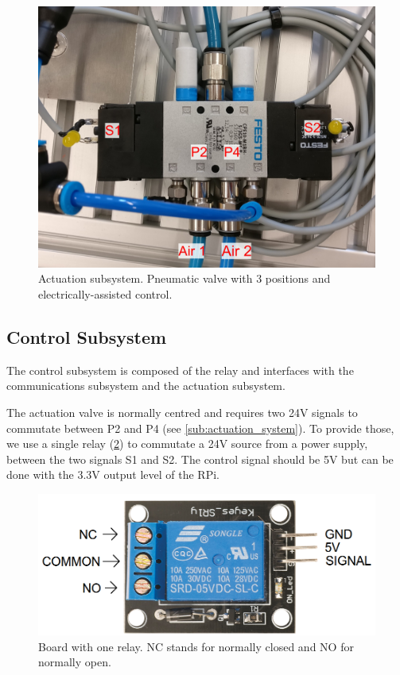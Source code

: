 \documentclass[twoside,a4paper]{refart}
\begin{document}
\begin{figure}[H]
	\centering
	\includegraphics[width=1.0\linewidth]{ph_actuation}
	\caption{Actuation subsystem. Pneumatic valve with 3 positions and electrically-assisted control.}
	\label{fig:ph_actuation}
\end{figure}

\subsection{Control Subsystem}
The control subsystem is composed of the relay and interfaces with the communications subsystem and the actuation subsystem.

 The actuation valve is normally centred and requires two 24V signals to commutate between P2 and P4 (see \cref{sub:actuation_system}). To provide those, we use a single relay (\cref{fig:relay_0}) to commutate a 24V source from a power supply, between the two signals S1 and S2. The control signal should be 5V but can be done with the 3.3V output level of the RPi.

\begin{figure}[H]
	\centering
	\includegraphics[width=0.7\linewidth]{relay_0}
	\caption{Board with one relay. NC stands for normally closed and NO for normally open.}
	\label{fig:relay_0}
\end{figure}
\end{document}
